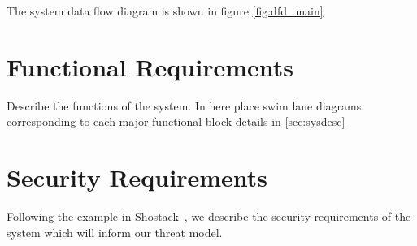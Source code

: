 The system data flow diagram is shown in figure \ref{fig:dfd_main}

\section{Functional Requirements}
\label{sec:funcreq}
Describe the functions of the system.  In here place swim lane
diagrams corresponding to each major functional block details in
\ref{sec:sysdesc}

\section{Security Requirements}
\label{sec:secreqs}
Following the example in Shostack~\cite{shostackbook}, we describe the
security requirements of the system which will inform our threat
model.
